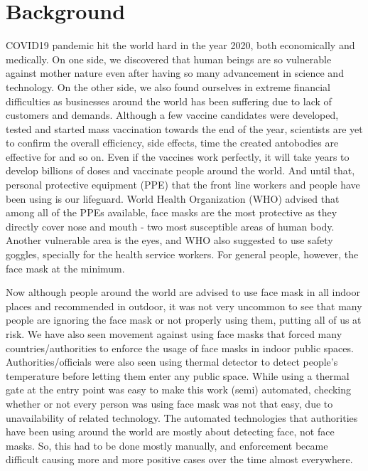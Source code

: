 \documentclass{svproc}
\begin{document}
\section{Background}
%
COVID19 pandemic hit the world hard in the year 2020, both economically and medically. On one side, we discovered that human beings are so vulnerable against mother nature even after having so many advancement in science and technology. On the other side, we also found ourselves in extreme financial difficulties as businesses around the world has been suffering due to lack of customers and demands. Although a few vaccine candidates were developed, tested and started mass vaccination towards the end of the year, scientists are yet to confirm the overall efficiency, side effects, time the created antobodies are effective for and so on. Even if the vaccines work perfectly, it will take years to develop billions of doses and vaccinate people around the world. And until that, personal protective equipment (PPE) that the front line workers and people have been using is our lifeguard. World Health Organization (WHO) advised that among all of the PPEs available, face masks are the most protective as they directly cover nose and mouth - two most susceptible areas of human body. Another vulnerable area is the eyes, and WHO also suggested to use safety goggles, specially for the health service workers. For general people, however, the face mask at the minimum. \\

\par Now although people around the world are advised to use face mask in all indoor places and recommended in outdoor, it was not very uncommon to see that many people are ignoring the face mask or not properly using them, putting all of us at risk. We have also seen movement against using face masks that forced many countries/authorities to enforce the usage of face masks in indoor public spaces. Authorities/officials were also seen using thermal detector to detect people's temperature before letting them enter any public space. While using a thermal gate at the entry point was easy to make this work (semi) automated, checking whether or not every person was using face mask was not that easy, due to unavailability of related technology. The automated technologies that authorities have been using around the world are mostly about detecting face, not face masks. So, this had to be done mostly manually, and enforcement became difficult causing more and more positive cases over the time almost everywhere. \\
\end{document}
